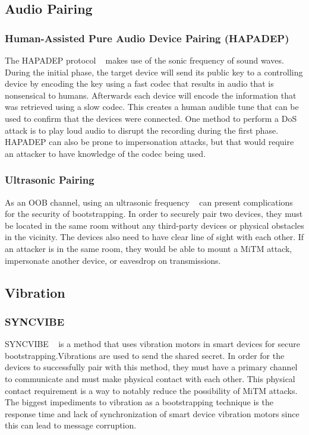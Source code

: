 \subsection{Audio Pairing}
\subsubsection{Human-Assisted Pure Audio Device Pairing (HAPADEP)}
The HAPADEP protocol ~\cite{soriente2008hapadep} makes use of the sonic frequency of sound waves. During the initial phase, the target device will send its public key to a controlling device by encoding the key using a fast codec that results in audio that is nonsensical to humans. Afterwards each device will encode the information that was retrieved using a slow codec. This creates a human audible tune that can be used to confirm that the devices were connected. One method to perform a DoS attack is to play loud audio to disrupt the recording during the first phase. HAPADEP can also be prone to impersonation attacks, but that would require an attacker to have knowledge of the codec being used. 

\subsubsection{Ultrasonic Pairing}
As an OOB channel, using an ultrasonic frequency ~\cite{mayrhofer2007security} can present complications for the security of bootstrapping. In order to securely pair two devices, they must be located in the same room without any third-party devices or physical obstacles in the vicinity. The devices also need to have clear line of sight with each other. If an attacker is in the same room, they would be able to mount a MiTM attack, impersonate another device, or eavesdrop on transmissions. 

\subsection{Vibration}
\subsubsection{SYNCVIBE}
SYNCVIBE ~\cite{lee2018syncvibe} is a method that uses vibration motors in smart devices for secure bootstrapping.Vibrations are used to send the shared secret. In order for the devices to successfully pair with this method, they must have a primary channel to communicate and must make physical contact with each other. This physical contact requirement is a way to notably reduce the possibility of MiTM attacks. The biggest impediments to vibration as a bootstrapping technique is the response time and lack of synchronization of smart device vibration motors since this can lead to message corruption.


